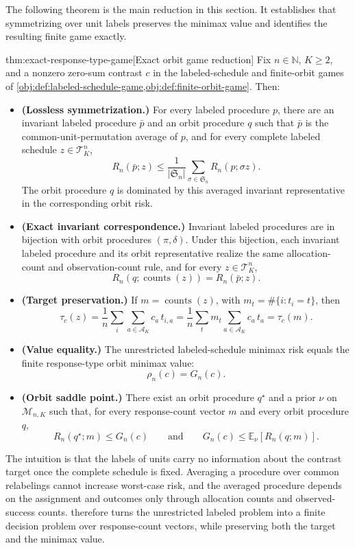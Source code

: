 \documentclass[11pt]{article}
\begin{document}
The following theorem is the main reduction in this section. It establishes that symmetrizing over unit labels preserves the minimax value and identifies the resulting finite game exactly.

\begin{theoremv}{thm:exact-response-type-game}[Exact orbit game reduction]
Fix \(n\in\mathbb N\), \(K\ge 2\), and a nonzero zero-sum contrast \(c\) in the labeled-schedule and finite-orbit games of \cref{obj:def:labeled-schedule-game,obj:def:finite-orbit-game}. Then:
\begin{itemize}
\item \textbf{(Lossless symmetrization.)} For every labeled procedure \(p\), there are an invariant labeled procedure \(\bar p\) and an orbit procedure \(q\) such that \(\bar p\) is the common-unit-permutation average of \(p\), and for every complete labeled schedule \(z\in\mathcal T_K^n\),
\[
R_n(\bar p;z)
\le
\frac{1}{|\mathfrak S_n|}
\sum_{\sigma\in\mathfrak S_n} R_n(p;\sigma z).
\]
The orbit procedure \(q\) is dominated by this averaged invariant representative in the corresponding orbit risk.
\item \textbf{(Exact invariant correspondence.)} Invariant labeled procedures are in bijection with orbit procedures \((\pi,\delta)\). Under this bijection, each invariant labeled procedure and its orbit representative realize the same allocation-count and observation-count rule, and for every \(z\in\mathcal T_K^n\),
\[
R_n(q;\operatorname{counts}(z))=R_n(\bar p;z).
\]
\item \textbf{(Target preservation.)} If \(m=\operatorname{counts}(z)\), with \(m_t=\#\{i:t_i=t\}\), then
\[
\tau_c(z)
=
\frac{1}{n}\sum_i\sum_{a\in\mathcal A_K} c_a\,t_{i,a}
=
\frac{1}{n}\sum_t m_t\sum_{a\in\mathcal A_K} c_a\,t_a
=
\tau_c(m).
\]
\item \textbf{(Value equality.)} The unrestricted labeled-schedule minimax risk equals the finite response-type orbit minimax value:
\[
\rho_n(c)=G_n(c).
\]
\item \textbf{(Orbit saddle point.)} There exist an orbit procedure \(q^\star\) and a prior \(\nu\) on \(\mathcal M_{n,K}\) such that, for every response-count vector \(m\) and every orbit procedure \(q\),
\[
R_n(q^\star;m)\le G_n(c)
\qquad\text{and}\qquad
G_n(c)\le \mathbb E_{\nu}\!\left[R_n(q;m)\right].
\]
\end{itemize}
\end{theoremv}

The intuition is that the labels of units carry no information about the contrast target once the complete schedule is fixed. Averaging a procedure over common relabelings cannot increase worst-case risk, and the averaged procedure depends on the assignment and outcomes only through allocation counts and observed-success counts.  therefore turns the unrestricted labeled problem into a finite decision problem over response-count vectors, while preserving both the target and the minimax value.
\end{document}

